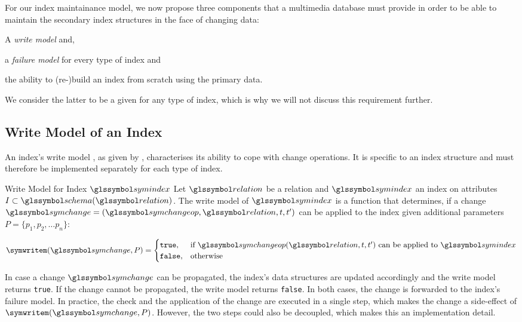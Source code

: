 For our index maintainance model, we now propose three components that a multimedia database must provide in order to be able to maintain the secondary index structures in the face of changing data: 
\begin{enumerate*}[label=(\roman*)]
    \item A \emph{write model} and,
    \item a \emph{failure model} for every type of index and
    \item the ability to (re-)build an index from scratch using the primary data.
\end{enumerate*}
We consider the latter to be a given for any type of index, which is why we will not discuss this requirement further.

\subsection{Write Model of an Index}
An index's write model , as given by , characterises its ability to cope with change operations. It is specific to an index structure and must therefore be implemented separately for each type of index.

\begin{definition}[label=definition:write_mode]{Write Model for Index $\symindex$}{}
    Let $\relation$ be a relation and $\symindex$ an index on attributes $I \subset \schema(\relation)$. The write model of $\symindex$ is a function that determines, if a change $\symchange = (\symchangeop, \relation, t, t^{\prime})$ can be applied to the index given additional parameters $P = \{p_1, p_2, \ldots p_n\}$:

    \begin{equation}
        \symwritem(\symchange,P) = 
        \begin{cases}
           \mathtt{true}, & \text{if } \symchangeop(\relation,t,t^{\prime}) \text{ can be applied to } \symindex \\
           \mathtt{false}, & \text{otherwise}
        \end{cases}
    \end{equation}
\end{definition}

In case a change $\symchange$ can be propagated, the index's data structures are updated accordingly and the write model returns \texttt{true}. If the change cannot be propagated, the write model returns \texttt{false}. In both cases, the change is forwarded to the index's failure model. In practice, the check and the application of the change are executed in a single step, which makes the change a side-effect of $\symwritem(\symchange,P)$. However, the two steps could also be decoupled, which makes this an implementation detail.

